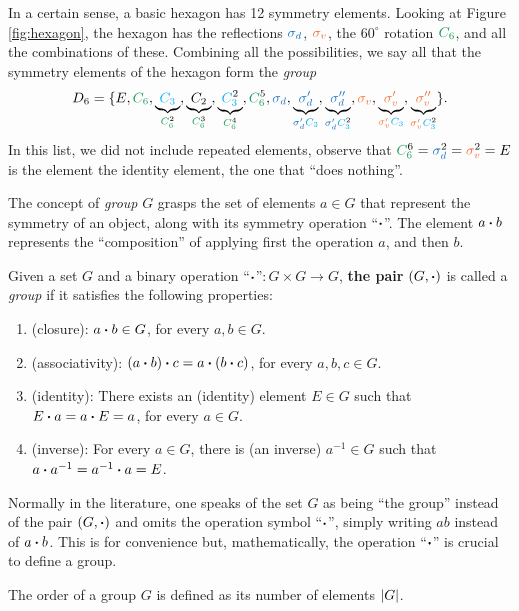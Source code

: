 In a certain sense, a basic hexagon has 12 symmetry elements. Looking at Figure \ref{fig:hexagon}, the hexagon has the reflections $\sd$, $\sv$, the $60^\circ$ rotation $\Cs$, and all the combinations of these. Combining all the possibilities, we say all that the symmetry elements of the hexagon form the \textit{group}
$$
D_6 = \{E, \Cs, \underbrace{\Ct}_{\Csn{2}}, \underbrace{C_2}_{\Csn{3}}, \underbrace{\Ctn{2}}_{\Csn{4}}, \Csn{5}, \sd, \underbrace{\sdp}_{\sdp \Ct}, \underbrace{\sdpp}_{\sdp \Ctn{2}}, \sv, \underbrace{\svp}_{\svp \Ct}, \underbrace{\svpp}_{\svp \Ctn{2}} \}.
$$
In this list, we did not include repeated elements, observe that $\Csn{6} = \sdn{2} = \svn{2} = E$ is the element the identity element, the one that ``does nothing''.

\n

The concept of \textit{group} $G$ grasps the set of elements $a \in G$ that represent the symmetry of an object, along with its symmetry operation ``$\vdot$''. The element $a \vdot b$ represents the ``composition'' of applying first the operation $a$, and then $b$.

\begin{definition}
Given a set $G$ and a binary operation ``$\vdot$''$:G\times G \to G$, \textbf{the pair} $(G, \vdot)$ is called a \textit{group} if it satisfies the following properties:
\begin{enumerate}
\item (closure): $a \vdot b \in G$, for every $a, b \in G$.
\item (associativity): $(a \vdot b) \vdot c =  a \vdot (b \vdot c)$, for every $a, b, c \in G$.
\item (identity): There exists an (identity) element $E \in G$ such that $E \vdot a = a \vdot E = a$, for every $a \in G$.
\item (inverse): For every $a \in G$, there is (an inverse) $a^{-1} \in G$ such that $a \vdot a^{-1} = a^{-1} \vdot a = E$.
\end{enumerate}
\end{definition}
Normally in the literature, one speaks of the set $G$ as being ``the group'' instead of the pair $(G, \vdot)$ and omits the operation symbol ``$\vdot$'', simply writing $ab$ instead of $a \vdot b$. This is for convenience but, mathematically, the operation ``$\vdot$'' is crucial to define a group.

\begin{definition}
The order of a group $G$ is defined as its number of elements $\abs{G}$.
\end{definition}

